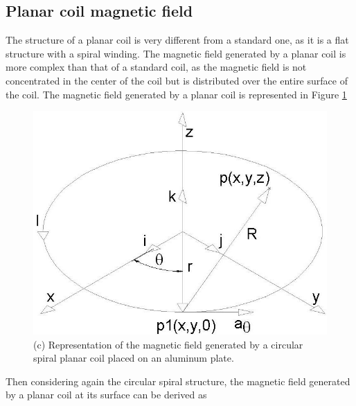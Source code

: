 \subsection{Planar coil magnetic field}
The structure of a planar coil is very different from a standard one, as it is a flat structure with a spiral winding. The magnetic field generated by a planar coil is more complex than that of a standard coil, as the magnetic field is not concentrated in the center of the coil but is distributed over the entire surface of the coil. The magnetic field generated by a planar coil is represented in Figure \ref{fig: Spiral magn field}

\begin{figure}[th]
    \centering
    \includegraphics[scale=0.4]{Chapters/Chapter2/PCB_coils/Figures/coil_field_diagram.png} %
    \caption[Spiral magn field]{(c) Representation of the magnetic field generated by a circular spiral planar coil placed on an aluminum plate.\cite{Spiral_Coil_magn_field}}
    \label{fig: Spiral magn field}
\end{figure}

Then considering again the circular spiral structure, the magnetic field generated by a planar coil at its surface can be derived as

